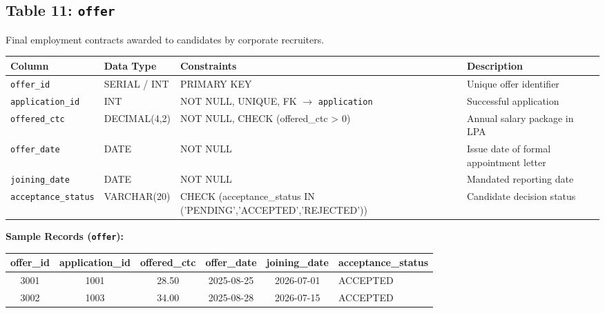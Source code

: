 \documentclass[11pt,a4paper]{article}
\begin{document}
\subsection{Table 11: \texttt{offer}}
Final employment contracts awarded to candidates by corporate recruiters.

\begin{table}[H]
    \centering
    \footnotesize
    \begin{tabularx}{\textwidth}{l l l X}
        \toprule
        \textbf{Column} & \textbf{Data Type} & \textbf{Constraints} & \textbf{Description} \\
        \midrule
        \texttt{offer\_id} & SERIAL / INT & PRIMARY KEY & Unique offer identifier \\
        \texttt{application\_id} & INT & NOT NULL, UNIQUE, FK \(\to\) \texttt{application} & Successful application \\
        \texttt{offered\_ctc} & DECIMAL(4,2) & NOT NULL, CHECK (offered\_ctc > 0) & Annual salary package in LPA \\
        \texttt{offer\_date} & DATE & NOT NULL & Issue date of formal appointment letter \\
        \texttt{joining\_date} & DATE & NOT NULL & Mandated reporting date \\
        \texttt{acceptance\_status} & VARCHAR(20) & CHECK (acceptance\_status IN ('PENDING','ACCEPTED','REJECTED')) & Candidate decision status \\
        \bottomrule
    \end{tabularx}
\end{table}

\textbf{Sample Records (\texttt{offer}):}
\begin{table}[H]
    \centering
    \scriptsize
    \begin{tabularx}{\textwidth}{c c c c c l}
        \toprule
        \textbf{offer\_id} & \textbf{application\_id} & \textbf{offered\_ctc} & \textbf{offer\_date} & \textbf{joining\_date} & \textbf{acceptance\_status} \\
        \midrule
        3001 & 1001 & 28.50 & 2025-08-25 & 2026-07-01 & ACCEPTED \\
        3002 & 1003 & 34.00 & 2025-08-28 & 2026-07-15 & ACCEPTED \\
        \bottomrule
    \end{tabularx}
\end{table}

\end{document}
